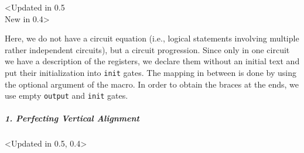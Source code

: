 \documentclass{scrartcl}
\makeatletter
\newenvironment{codeexample*}{%
   \VerbatimEnvironment%
   \let\FVB@VerbatimOut\minted@FVB@VerbatimOut
   \let\FVE@VerbatimOut\minted@FVE@VerbatimOut
   \minted@configlang{tex}%
   \minted@fvset
   \begin{VerbatimOut}[codes={\catcode`\^^I=12},firstline,lastline]{\minted@jobname.pyg}%
}{
   \end{VerbatimOut}%
   \minted@langlinenoson%
   \begin{adjustbox}{center}
       \minted@jobname.pyg %
   \end{adjustbox}\nopagebreak
   \expandafter\minted@pygmentize\expandafter{\minted@lang}%
   \minted@langlinenosoff%
   \par%
}
\def\ttlink{\link\texttt}
\def\texlink{\link\tex}
\makeatother
\begin{document}
               \clearpage
               \begin{example}<Updated in 0.5\\New in 0.4>
                  \begin{codeexample*}
\begin{yquantgroup}
\end{yquantgroup}
                  \end{codeexample*}
                  Here, we do not have a circuit equation (i.e., logical statements involving multiple rather independent circuits), but a circuit progression.
                  Since only in one circuit we have a description of the registers, we declare them without an initial text and put their initialization into \ttlink{init} gates.
                  The mapping in between is done by using the optional argument of the \texlink[groups/equals]{\equals} macro.
                  In order to obtain the braces at the ends, we use empty \ttlink{output} and \ttlink{init} gates.
               \end{example}

               \clearpage
               \subparagraph{1. Perfecting Vertical Alignment}\leavevmode
                  \begin{example}<Updated in 0.5, 0.4>
                     \begin{codeexample*}
\begin{yquantgroup}
   \equals
\end{yquantgroup}
                     \end{codeexample*}
                  \end{example}
\end{document}
